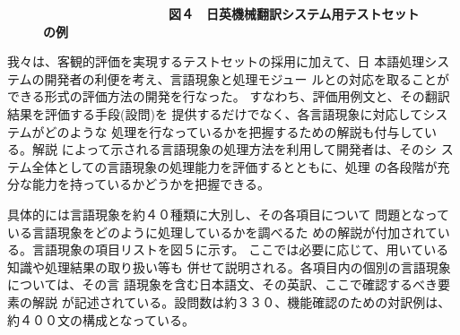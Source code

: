 \begin{figure}
\begin{small}
\begin{verbatim}
\end{verbatim}
\end{small}

{\bf　　　　　　　　　　図４　日英機械翻訳システム用テストセットの例}

\end{figure}

我々は、客観的評価を実現するテストセットの採用に加えて、日
本語処理システムの開発者の利便を考え、言語現象と処理モジュー
ルとの対応を取ることができる形式の評価方法の開発を行なった。
すなわち、評価用例文と、その翻訳結果を評価する手段(設問)を
提供するだけでなく、各言語現象に対応してシステムがどのような
処理を行なっているかを把握するための解説も付与している。解説
によって示される言語現象の処理方法を利用して開発者は、そのシ
ステム全体としての言語現象の処理能力を評価するとともに、処理
の各段階が充分な能力を持っているかどうかを把握できる。

具体的には言語現象を約４０種類に大別し、その各項目について
問題となっている言語現象をどのように処理しているかを調べるた
めの解説が付加されている。言語現象の項目リストを図５に示す。
ここでは必要に応じて、用いている知識や処理結果の取り扱い等も
併せて説明される。各項目内の個別の言語現象については、その言
語現象を含む日本語文、その英訳、ここで確認するべき要素の解説
が記述されている。設問数は約３３０、機能確認のための対訳例は、
約４００文の構成となっている。

